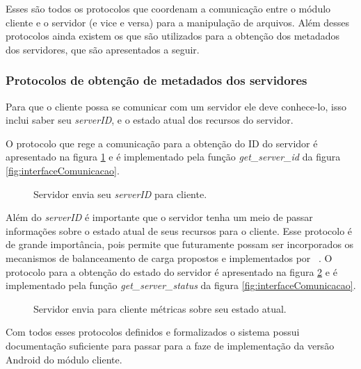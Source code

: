         Esses são todos os protocolos que coordenam a comunicação entre o módulo cliente e o servidor (e vice e versa) para a manipulação de arquivos. Além desses protocolos ainda existem os que são utilizados para a obtenção dos metadados dos servidores, que são apresentados a seguir.
        
        
        \subsubsection{Protocolos de obtenção de metadados dos servidores}
        
        Para que o cliente possa se comunicar com um servidor ele deve conhece-lo, isso inclui saber seu \textit{serverID}, e o estado atual dos recursos do servidor.
        
        O protocolo que rege a comunicação para a obtenção do ID do servidor é apresentado na figura \ref{fig:protGetServerID} e é implementado pela função \textit{get\_server\_id} da figura \ref{fig:interfaceComunicacao}.
        
        
        \begin{figure}[!ht]
        \caption{Servidor envia seu \textit{serverID} para cliente.}
        \label{fig:protGetServerID}
        \end{figure}
    
        Além do \textit{serverID} é importante que o servidor tenha um meio de passar informações sobre o estado atual de seus recursos para o cliente. Esse protocolo é de grande importância, pois permite que futuramente possam ser incorporados  os mecanismos de balanceamento de carga propostos e implementados por ~\cite{danilo}.
        O protocolo para a obtenção do estado do servidor é apresentado na figura \ref{fig:protServerGetStatus} e é implementado pela função \textit{get\_server\_status} da figura \ref{fig:interfaceComunicacao}.
        
         \begin{figure}[!ht]
         \caption{Servidor envia para cliente métricas sobre seu estado atual.}
         \label{fig:protServerGetStatus}
         \end{figure}
        
        Com todos esses protocolos definidos e formalizados o sistema possui documentação suficiente para passar para a faze de implementação da versão Android do módulo cliente.
        
